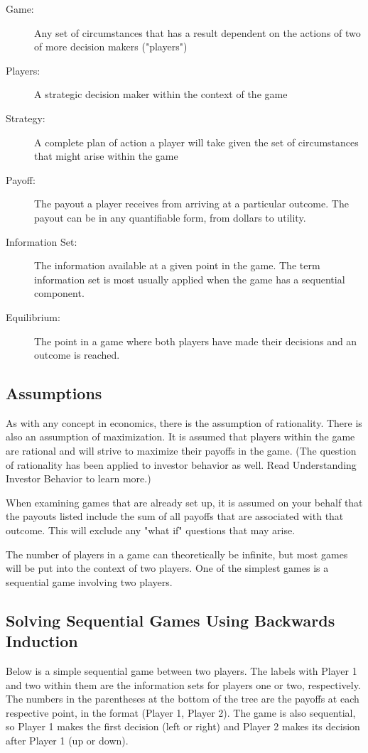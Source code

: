 \begin{description}
\item[Game:] Any set of circumstances that has a result dependent on the actions of two of more decision makers ("players")
\item[Players:] A strategic decision maker within the context of the game
\item[Strategy:] A complete plan of action a player will take given the set of circumstances that might arise within the game
\item[Payoff:] The payout a player receives from arriving at a particular outcome. The payout can be in any quantifiable form, from dollars to utility.
\item[Information Set:] The information available at a given point in the game. The term information set is most usually applied when the game has a sequential component.
\item[Equilibrium:] The point in a game where both players have made their decisions and an outcome is reached.
\end{description}

\subsection{Assumptions}
As with any concept in economics, there is the assumption of rationality. There is also an assumption of maximization. It is assumed that players within the game are rational and will strive to maximize their payoffs in the game. (The question of rationality has been applied to investor behavior as well. Read Understanding Investor Behavior to learn more.)

When examining games that are already set up, it is assumed on your behalf that the payouts listed include the sum of all payoffs that are associated with that outcome. This will exclude any "what if" questions that may arise.

The number of players in a game can theoretically be infinite, but most games will be put into the context of two players. One of the simplest games is a sequential game involving two players.

\subsection{Solving Sequential Games Using Backwards Induction}
Below is a simple sequential game between two players. The labels with Player 1 and two within them are the information sets for players one or two, respectively. The numbers in the parentheses at the bottom of the tree are the payoffs at each respective point, in the format (Player 1, Player 2). The game is also sequential, so Player 1 makes the first decision (left or right) and Player 2 makes its decision after Player 1 (up or down).


